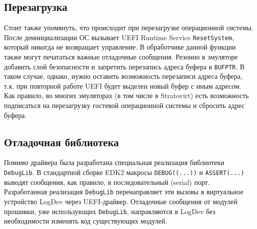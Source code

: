 \subsection{Перезагрузка}

Стоит также упомянуть, что происходит при перезагрузке операционной системы. После деинициализации ОС вызывает UEFI Runtime Service \texttt{ResetSystem}, который никогда не возвращает управление. В обработчике данной функции также могут печататься важные отладочные сообщения.
Резонно в эмуляторе добавить слой безопасности и запретить перезапись адреса буфера в \texttt{BUFPTR}. В таком случае, однако, нужно оставить возможность перезаписи адреса буфера, т.к. при повторной работе UEFI будет выделен новый буфер с иным адресом. Как правило, во многих эмуляторах (в том числе в Stratovirt) есть возможность подписаться на перезагрузку гостевой операционной системы и сбросить адрес буфера.

\subsection{Отладочная библиотека}


Помимо драйвера была разработана специальная реализация библиотеки \texttt{DebugLib}.
В стандартной сборке EDK2 макросы \texttt{DEBUG((...))} и \texttt{ASSERT(...)} выводят
сообщения, как правило, в последовательный (serial) порт. Разработанная реализация \texttt{DebugLib} перенаправляет эти вызовы в виртуальное устройство LogDev через UEFI-драйвер. Отладочные сообщения от модулей прошивки, уже использующих \texttt{DebugLib}, направляются в LogDev без необходимости изменять код существующих модулей.
